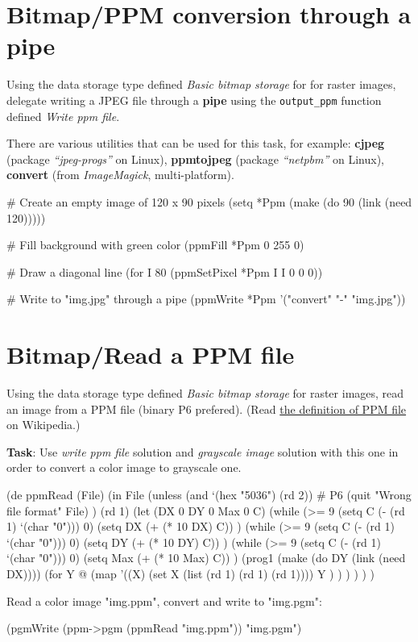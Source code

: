 \pagebreak{}
\section*{Bitmap/PPM conversion through a pipe}


Using the data storage type defined \emph{Basic bitmap storage} for
for raster images, delegate writing a JPEG file through a
\textbf{pipe} using the \texttt{output\_ppm} function defined
\emph{Write ppm file}.

There are various utilities that can be used for this task, for example:
\textbf{cjpeg} (package \emph{``jpeg-progs''} on Linux),
\textbf{ppmtojpeg} (package \emph{``netpbm''} on Linux),
\textbf{convert} (from \emph{ImageMagick}, multi-platform).


\begin{wideverbatim}

# Create an empty image of 120 x 90 pixels
(setq *Ppm (make (do 90 (link (need 120)))))

# Fill background with green color
(ppmFill *Ppm 0 255 0)

# Draw a diagonal line
(for I 80 (ppmSetPixel *Ppm I I 0 0 0))

# Write to "img.jpg" through a pipe
(ppmWrite *Ppm '("convert" "-" "img.jpg"))

\end{wideverbatim}

\pagebreak{}
\section*{Bitmap/Read a PPM file}

Using the data storage type defined \emph{Basic bitmap storage} for
raster images, read an image from a PPM file (binary P6 prefered).
(Read \href{http://en.wikipedia.org/wiki/Netpbm\_format}{the
  definition of PPM file} on Wikipedia.)

\textbf{Task}: Use \emph{write ppm file} solution and \emph{grayscale
  image} solution with this one in order to convert a color image to
grayscale one.

\begin{wideverbatim}

(de ppmRead (File)
   (in File
      (unless (and `(hex "5036") (rd 2))  # P6
         (quit "Wrong file format" File) )
      (rd 1)
      (let (DX 0  DY 0  Max 0  C)
         (while (>= 9 (setq C (- (rd 1) `(char "0"))) 0)
            (setq DX (+ (* 10 DX) C)) )
         (while (>= 9 (setq C (- (rd 1) `(char "0"))) 0)
            (setq DY (+ (* 10 DY) C)) )
         (while (>= 9 (setq C (- (rd 1) `(char "0"))) 0)
            (setq Max (+ (* 10 Max) C)) )
         (prog1
            (make (do DY (link (need DX))))
            (for Y @
               (map
                  '((X) (set X (list (rd 1) (rd 1) (rd 1))))
                  Y ) ) ) ) ) )

Read a color image "img.ppm", convert and write to "img.pgm":

(pgmWrite (ppm->pgm (ppmRead "img.ppm")) "img.pgm")

\end{wideverbatim}

